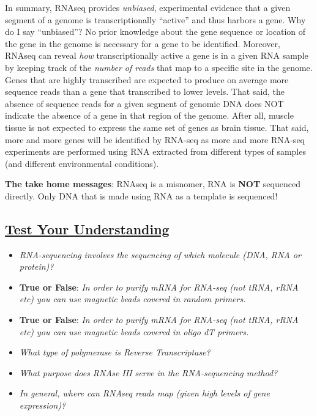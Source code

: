 \documentclass[
]{book}
\providecommand{\tightlist}{%
  \setlength{\itemsep}{0pt}\setlength{\parskip}{0pt}}
\begin{document}
In summary, RNAseq provides \emph{unbiased}, experimental evidence that a given segment of a genome is transcriptionally ``active'' and thus harbors a gene. Why do I say ``unbiased''? No prior knowledge about the gene sequence or location of the gene in the genome is necessary for a gene to be identified. Moreover, RNAseq can reveal \emph{how} transcriptionally active a gene is in a given RNA sample by keeping track of the \emph{number of reads} that map to a specific site in the genome. Genes that are highly transcribed are expected to produce on average more sequence reads than a gene that transcribed to lower levels. That said, the absence of sequence reads for a given segment of genomic DNA does NOT indicate the absence of a gene in that region of the genome. After all, muscle tissue is not expected to express the same set of genes as brain tissue. That said, more and more genes will be identified by RNA-seq as more and more RNA-seq experiments are performed using RNA extracted from different types of samples (and different environmental conditions).

\textbf{The take home messages}: RNAseq is a misnomer, RNA is \textbf{NOT} sequenced directly. Only DNA that is made using RNA as a template is sequenced!

\hypertarget{test-your-understanding-10}{%
\subsection{\texorpdfstring{\href{https://docs.google.com/forms/d/e/1FAIpQLSewKpJdsq0wm_uRGAblrKawwG5mvWVZieFe2sh1cH8FHjEpOg/viewform?usp=sf_link}{Test Your Understanding}}{Test Your Understanding}}\label{test-your-understanding-10}}

\begin{itemize}
\tightlist
\item
  \emph{RNA-sequencing involves the sequencing of which molecule (DNA, RNA or protein)?}
\item
  \textbf{True or False}: \emph{In order to purify mRNA for RNA-seq (not tRNA, rRNA etc) you can use magnetic beads covered in random primers.}
\item
  \textbf{True or False}: \emph{In order to purify mRNA for RNA-seq (not tRNA, rRNA etc) you can use magnetic beads covered in oligo dT primers.}
\item
  \emph{What type of polymerase is Reverse Transcriptase?}
\item
  \emph{What purpose does RNAse III serve in the RNA-sequencing method?}
\item
  \emph{In general, where can RNAseq reads map (given high levels of gene expression)?}
\end{itemize}
\end{document}
